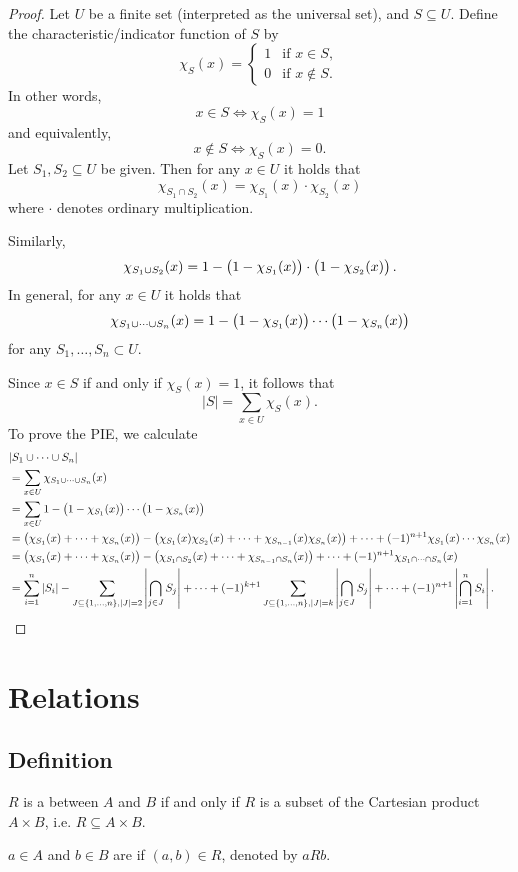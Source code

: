 \begin{proof}
Let $U$ be a finite set (interpreted as the universal set), and $S\subseteq U$. Define the characteristic/indicator function of $S$ by
\[ \chi_S(x)=\begin{cases}
1&\text{if }x\in S,\\
0&\text{if }x\notin S.
\end{cases} \]
In other words,
\[ x\in S\iff\chi_S(x)=1 \]
and equivalently,
\[ x\notin S\iff\chi_S(x)=0. \]
Let $S_1,S_2\subseteq U$ be given. Then for any $x\in U$ it holds that
\[ \chi_{S_1\cap S_2}(x)=\chi_{S_1}(x)\cdot\chi_{S_2}(x) \]
where $\cdot$ denotes ordinary multiplication.

Similarly,
\[ \chi_{S_1\cup S_2}(x)=1-\left(1-\chi_{S_1}(x)\right)\cdot\left(1-\chi_{S_2}(x)\right). \]
In general, for any $x\in U$ it holds that
\[ \chi_{S_1\cup\cdots\cup S_n}(x)=1-\left(1-\chi_{S_1}(x)\right)\cdots\left(1-\chi_{S_n}(x)\right) \]
for any $S_1,\dots,S_n\subset U$.

Since $x\in S$ if and only if $\chi_S(x)=1$, it follows that
\[ |S|=\sum_{x\in U}\chi_S(x). \]
To prove the PIE, we calculate
\begin{align*}
&|S_1\cup\cdots\cup S_n|\\
&=\sum_{x\in U}\chi_{S_1\cup\cdots\cup S_n}(x)\\
&=\sum_{x\in U}1-\left(1-\chi_{S_1}(x)\right)\cdots\left(1-\chi_{S_n}(x)\right)\\
&=\left(\chi_{S_1}(x)+\cdots+\chi_{S_n}(x)\right)-\left(\chi_{S_1}(x)\chi_{S_2}(x)+\cdots+\chi_{S_{n-1}}(x)\chi_{S_n}(x)\right)+\cdots+(-1)^{n+1}\chi_{S_1}(x)\cdots\chi_{S_n}(x)\\
&=\left(\chi_{S_1}(x)+\cdots+\chi_{S_n}(x)\right)-\left(\chi_{S_1\cap S_2}(x)+\cdots+\chi_{S_{n-1}\cap S_n}(x)\right)+\cdots+(-1)^{n+1}\chi_{S_1\cap\cdots\cap S_n}(x)\\
&=\sum_{i=1}^n|S_i|-\sum_{J\subseteq\{1,\dots,n\},|J|=2}\left|\bigcap_{j\in J}S_j\right|+\cdots+(-1)^{k+1}\sum_{J\subseteq\{1,\dots,n\},|J|=k}\left|\bigcap_{j\in J}S_j\right|+\cdots+(-1)^{n+1}\left|\bigcap_{i=1}^nS_i\right|.
\end{align*}
\end{proof}
\pagebreak

\section{Relations}
\subsection{Definition}
\begin{definition}
$R$ is a  between $A$ and $B$ if and only if $R$ is a subset of the Cartesian product $A \times B$, i.e. $R \subseteq A \times B$.

$a \in A$ and $b \in B$ are  if $(a,b) \in R$, denoted by $a R b$.
\end{definition}

